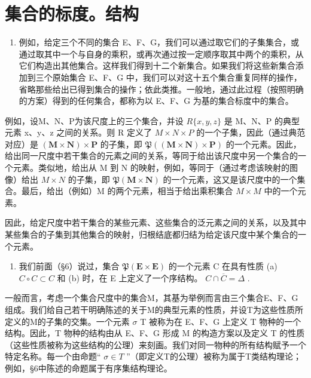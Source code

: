 \section{集合的标度。结构}

\begin{enumerate}
\def\labelenumi{\arabic{enumi}.}
\tightlist
\item
  例如，给定三个不同的集合 E、F、G，我们可以通过取它们的子集集合，或通过取其中一个与自身的乘积，或再次通过按一定顺序取其中两个的乘积，从它们构造出其他集合。这样我们得到十二个新集合。如果我们将这些新集合添加到三个原始集合 E、F、G 中，我们可以对这十五个集合重复同样的操作，省略那些给出已得到集合的操作；依此类推。一般地，通过此过程（按照明确的方案）得到的任何集合，都称为以 E、F、G 为基的集合标度中的集合。
\end{enumerate}

例如，设M、N、P为该尺度上的三个集合，并设 \(R\{x, y, z\}\) 是 M、N、P 的典型元素 x、y、z 之间的关系。则 R 定义了 \(M \times N \times P\) 的一个子集，因此（通过典范对应）是 \((\mathbf{M} \times \mathbf{N}) \times \mathbf{P}\) 的子集，即 \(\mathfrak{P}((\mathbf{M} \times \mathbf{N}) \times \mathbf{P})\) 的一个元素。因此，给出同一尺度中若干集合的元素之间的关系，等同于给出该尺度中另一个集合的一个元素。类似地，给出从 M 到 N 的映射，例如，等同于（通过考虑该映射的图像）给出 \(M \times N\) 的子集，即 \(\mathfrak{P}(\mathbf{M} \times \mathbf{N})\) 的一个元素，这又是该尺度中的一个集合。最后，给出（例如）M 的两个元素，相当于给出乘积集合 \(M \times M\) 中的一个元素。

因此，给定尺度中若干集合的某些元素、这些集合的泛元素之间的关系，以及其中某些集合的子集到其他集合的映射，归根结底都归结为给定该尺度中某个集合的一个元素。

\begin{enumerate}
\def\labelenumi{\arabic{enumi}.}
\setcounter{enumi}{1}
\tightlist
\item
  我们前面（§6）说过，集合 \(\mathfrak{P}(\mathbf{E} \times \mathbf{E})\) 的一个元素 C 在具有性质 (a) \(C \circ C \subset C\) 和 (b) 时，在 E 上定义了一个序结构。 \(C \cap \overline{C} = \Delta\) .
\end{enumerate}

一般而言，考虑一个集合尺度中的集合M，其基为举例而言由三个集合E、F、G组成。我们给自己若干明确陈述的关于M的典型元素的性质，并设T为这些性质所定义的M的子集的交集。一个元素 \(\sigma\) T 被称为在 E、F、G 上定义 T 物种的一个结构。因此，T 物种的结构由从 E、F、G 形成 M 的构造方案以及定义 T 的性质（这些性质被称为这些结构的公理）来刻画。我们对同一物种的所有结构赋予一个特定名称。每一个由命题“ \(\sigma \in T\) ''（即定义T的公理）被称为属于T类结构理论；例如，§6中陈述的命题属于有序集结构理论。

